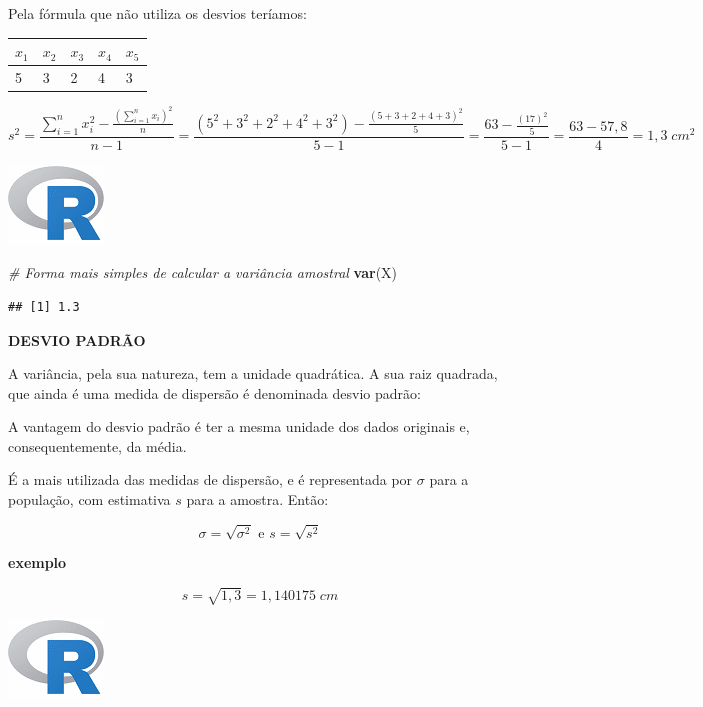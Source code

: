 \documentclass[
]{book}
\newenvironment{Shaded}{\begin{snugshade}}{\end{snugshade}}
\newcommand{\CommentTok}[1]{\textcolor[rgb]{0.56,0.35,0.01}{\textit{#1}}}
\newcommand{\KeywordTok}[1]{\textcolor[rgb]{0.13,0.29,0.53}{\textbf{#1}}}
\newcommand{\NormalTok}[1]{#1}
\begin{document}
Pela fórmula que não utiliza os desvios teríamos:

\begin{longtable}[]{@{}lllll@{}}
\toprule
\(x_1\) & \(x_2\) & \(x_3\) & \(x_4\) & \(x_5\)\tabularnewline
\midrule
\endhead
5 & 3 & 2 & 4 & 3\tabularnewline
\bottomrule
\end{longtable}

\[
s^2 =\frac{\sum_{i=1}^nx_i^2-\frac{(\sum_{i=1}^n x_i)^2}{n}}{n-1} = \frac{(5^2+3^2+2^2+4^2+3^2)-\frac{(5+3+2+4+3)^2}{5}}{5-1} = \frac{63-\frac{(17)^2}{5}}{5-1} = \frac{63-57,8}{4}=1,3 \;cm^2
\]

\includegraphics{R.png}

\begin{Shaded}
\begin{Highlighting}[]
\CommentTok{# Forma mais simples de calcular a variância amostral}
\KeywordTok{var}\NormalTok{(X)}
\end{Highlighting}
\end{Shaded}

\begin{verbatim}
## [1] 1.3
\end{verbatim}

\textbf{DESVIO PADRÃO}

A variância, pela sua natureza, tem a unidade quadrática. A sua raiz quadrada, que ainda é uma medida de dispersão é denominada desvio padrão:

A vantagem do desvio padrão é ter a mesma unidade dos dados originais e, consequentemente, da média.

É a mais utilizada das medidas de dispersão, e é representada por \(\sigma\) para a população, com estimativa \(s\) para a amostra. Então:

\[
\sigma = \sqrt{\sigma^2} \text{   e    } s = \sqrt{s^2}
\]

\textbf{exemplo}

\[
s = \sqrt{1,3} = 1,140175\;cm
\]

\includegraphics{R.png}
\end{document}
